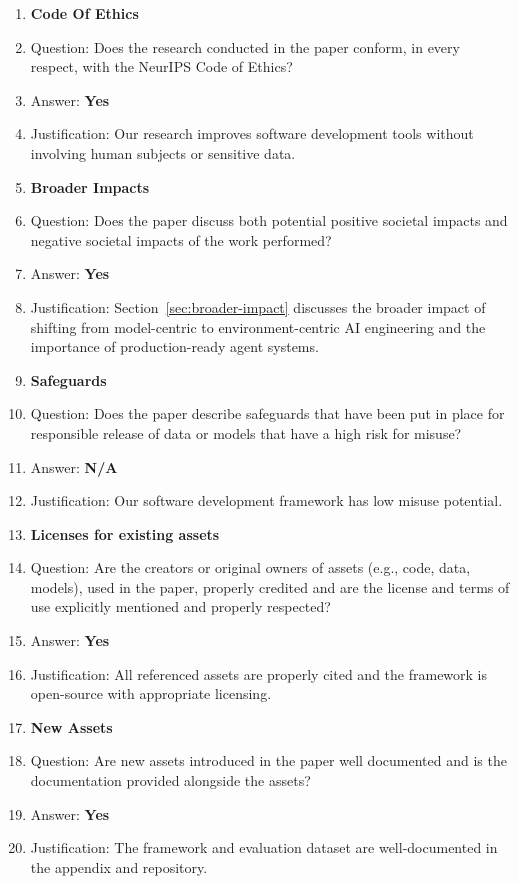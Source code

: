 \documentclass{article}
\begin{document}
\begin{enumerate}
\item {\bf Code Of Ethics}
    \item[] Question: Does the research conducted in the paper conform, in every respect, with the NeurIPS Code of Ethics?
    \item[] Answer: \textbf{Yes}
    \item[] Justification: Our research improves software development tools without involving human subjects or sensitive data.

\item {\bf Broader Impacts}
    \item[] Question: Does the paper discuss both potential positive societal impacts and negative societal impacts of the work performed?
    \item[] Answer: \textbf{Yes}
    \item[] Justification: Section~\ref{sec:broader-impact} discusses the broader impact of shifting from model-centric to environment-centric AI engineering and the importance of production-ready agent systems.

\item {\bf Safeguards}
    \item[] Question: Does the paper describe safeguards that have been put in place for responsible release of data or models that have a high risk for misuse?
    \item[] Answer: \textbf{N/A}
    \item[] Justification: Our software development framework has low misuse potential.

\item {\bf Licenses for existing assets}
    \item[] Question: Are the creators or original owners of assets (e.g., code, data, models), used in the paper, properly credited and are the license and terms of use explicitly mentioned and properly respected?
    \item[] Answer: \textbf{Yes}
    \item[] Justification: All referenced assets are properly cited and the framework is open-source with appropriate licensing.

\item {\bf New Assets}
    \item[] Question: Are new assets introduced in the paper well documented and is the documentation provided alongside the assets?
    \item[] Answer: \textbf{Yes}
    \item[] Justification: The framework and evaluation dataset are well-documented in the appendix and repository.


\end{enumerate}
\end{document}
